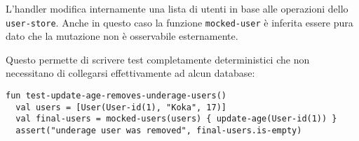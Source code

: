 L'handler modifica internamente una lista di utenti in base alle operazioni dello \lstinline{user-store}. Anche in questo caso la funzione \lstinline{mocked-user} è inferita essere pura dato che la mutazione non è osservabile esternamente.

Questo permette di scrivere test completamente deterministici che non necessitano di collegarsi effettivamente ad alcun database:
\begin{lstlisting}[language=koka]
fun test-update-age-removes-underage-users()
  val users = [User(User-id(1), "Koka", 17)]
  val final-users = mocked-users(users) { update-age(User-id(1)) }
  assert("underage user was removed", final-users.is-empty)
\end{lstlisting}






